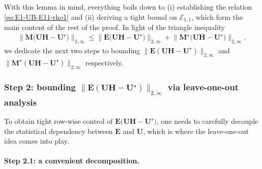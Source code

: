 











With this lemma in mind, everything boils down to (i) establishing the relation \eqref{eq:E1-UB-E11-rho1} and (ii) deriving a tight bound on $\mathcal{E}_{1,1}$, which form the main content of the rest of the proof. In light of the triangle inequality
%
\begin{align*}
	\big\|\bm{M}\big(\bm{U}\bm{H}-\bm{U}^{\star}\big)\big\|_{2,\infty}
	\leq
	\big\|\bm{E} \big(\bm{U}\bm{H}-\bm{U}^{\star}\big)\big\|_{2,\infty}
	+ \big\|\bm{M}^{\star}\big(\bm{U}\bm{H}-\bm{U}^{\star}\big)\big\|_{2,\infty},
\end{align*}
%
we dedicate the next two steps to bounding $\|\bm{E} (\bm{U}\bm{H}-\bm{U}^{\star} ) \|_{2,\infty}$ and $\|\bm{M}^{\star} (\bm{U}\bm{H}-\bm{U}^{\star}) \|_{2,\infty}$ respectively.





\subsubsection{Step 2: bounding $\|\bm{E} (\bm{U}\bm{H}-\bm{U}^{\star}) \|_{2,\infty}$ via leave-one-out analysis}

To obtain tight row-wise control of $\bm{E}\big(\bm{U}\bm{H}-\bm{U}^{\star}\big)$, one needs to carefully decouple the statistical dependency between $\bm{E}$ and $\bm{U}$,  which is where the leave-one-out idea comes into play.



\paragraph{Step 2.1: a convenient decomposition.}

